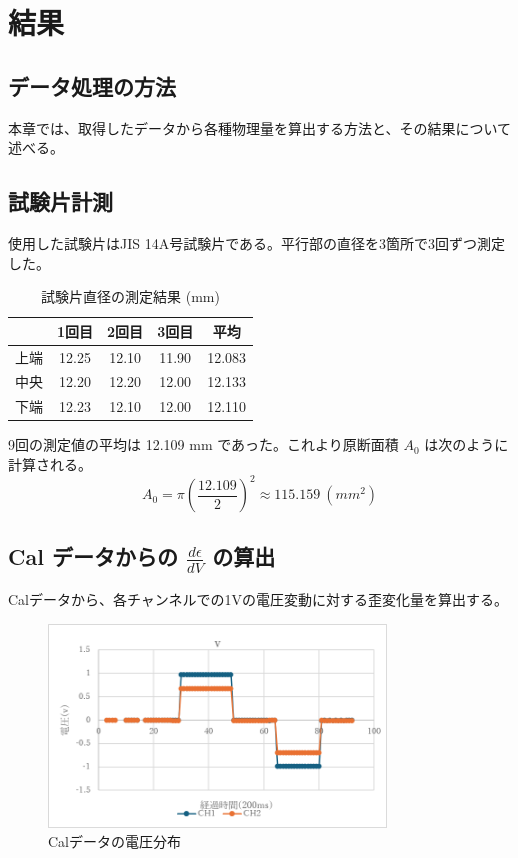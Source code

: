 \documentclass[11pt, a4paper, dvipdfmx]{jsreport}
\begin{document}
\section{結果}
\subsection{データ処理の方法}
本章では、取得したデータから各種物理量を算出する方法と、その結果について述べる。

\subsection{試験片計測}
使用した試験片はJIS 14A号試験片である。平行部の直径を3箇所で3回ずつ測定した。
\begin{table}[H]
    \centering
    \caption{試験片直径の測定結果 (mm)}
    \begin{tabular}{|l|c|c|c|c|}
        \hline
         & 1回目 & 2回目 & 3回目 & 平均 \\ \hline
        上端 & 12.25 & 12.10 & 11.90 & 12.083 \\ \hline
        中央 & 12.20 & 12.20 & 12.00 & 12.133 \\ \hline
        下端 & 12.23 & 12.10 & 12.00 & 12.110 \\ \hline
    \end{tabular}
\end{table}


9回の測定値の平均は 12.109 mm であった。これより原断面積 $A_0$ は次のように計算される。
$$
A_0 = \pi \left( \frac{12.109}{2} \right)^2 \approx 115.159 \ (mm^2)
$$

\subsection{Cal データからの $\frac{d\epsilon}{dV}$ の算出}
Calデータから、各チャンネルでの1Vの電圧変動に対する歪変化量を算出する。
\begin{figure}[H]
    \centering
    \includegraphics[width=0.8\textwidth]{summer/ship-experiment/tension/pictures/cal_voltage.png}
    \caption{Calデータの電圧分布}
    \label{fig:cal_voltage}
\end{figure}
\end{document}
